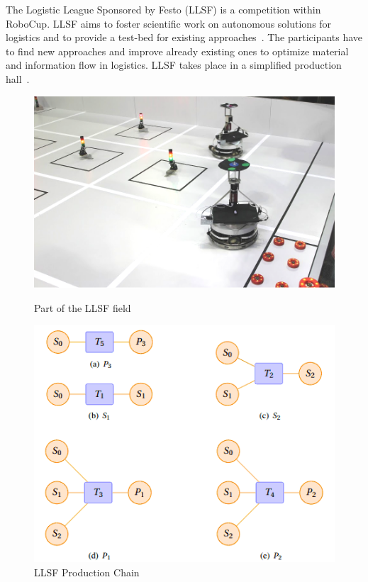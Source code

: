 \label{sec:llsf}
The Logistic League Sponsored by Festo (LLSF) is a competition within RoboCup. LLSF aims to foster scientific work on autonomous solutions for logistics and to provide a test-bed for existing approaches~\cite{LLSFTestbed}. The participants have to find new approaches and improve already existing ones to optimize material and information flow in logistics.
LLSF takes place  in a simplified production hall~\cite{LLSFRules}.
\begin{figure}
\begin{minipage}[b]{0.5\linewidth}
\includegraphics[scale=0.23]{pics/llsf}
\caption{Part of the LLSF field}
\label{fig:llsf_field}
\end{minipage}
\quad
\begin{minipage}[b]{0.5\linewidth}
\includegraphics[scale=0.45]{pics/production_chain}
\caption{LLSF Production Chain~\cite{LLSFRules}}
\label{fig:llsf_chain}
\end{minipage}
\end{figure}

